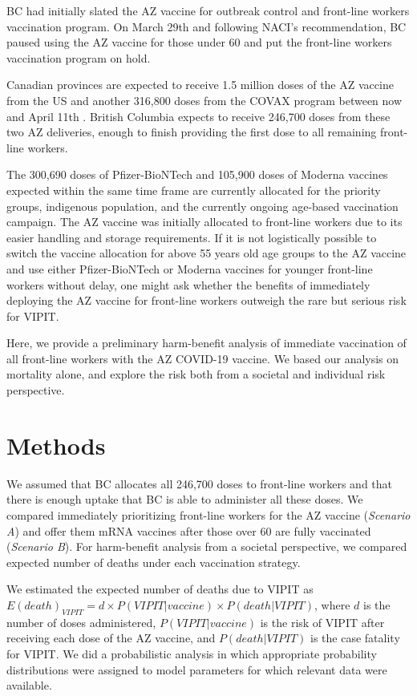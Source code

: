 \documentclass[]{interact}
\theoremstyle{plain}%
\theoremstyle{definition}
\theoremstyle{remark}
\begin{document}
BC had initially slated the AZ vaccine for outbreak control and
front-line workers vaccination program. On March 29th and following
NACI's recommendation, BC paused using the AZ vaccine for those under 60
and put the front-line workers vaccination program on hold.

Canadian provinces are expected to receive 1.5 million doses of the AZ
vaccine from the US and another 316,800 doses from the COVAX program
between now and April 11th \citep{government_of_canada_vaccines_2021}.
British Columbia expects to receive 246,700 doses from these two AZ
deliveries, enough to finish providing the first dose to all remaining
front-line workers.

The 300,690 doses of Pfizer-BioNTech and 105,900 doses of Moderna
vaccines expected within the same time frame are currently allocated for
the priority groups, indigenous population, and the currently ongoing
age-based vaccination campaign. The AZ vaccine was initially allocated
to front-line workers due to its easier handling and storage
requirements. If it is not logistically possible to switch the vaccine
allocation for above 55 years old age groups to the AZ vaccine and use
either Pfizer-BioNTech or Moderna vaccines for younger front-line
workers without delay, one might ask whether the benefits of immediately
deploying the AZ vaccine for front-line workers outweigh the rare but
serious risk for VIPIT.

Here, we provide a preliminary harm-benefit analysis of immediate
vaccination of all front-line workers with the AZ COVID-19 vaccine. We
based our analysis on mortality alone, and explore the risk both from a
societal and individual risk perspective.

\hypertarget{methods}{%
\section{Methods}\label{methods}}

We assumed that BC allocates all 246,700 doses to front-line workers and
that there is enough uptake that BC is able to administer all these
doses. We compared immediately prioritizing front-line workers for the
AZ vaccine (\emph{Scenario A}) and offer them mRNA vaccines after those
over 60 are fully vaccinated (\emph{Scenario B}). For harm-benefit
analysis from a societal perspective, we compared expected number of
deaths under each vaccination strategy.

We estimated the expected number of deaths due to VIPIT as
\(E(death)_{VIPIT} = d \times P(VIPIT|vaccine) \times P(death|VIPIT)\),
where \(d\) is the number of doses administered, \(P(VIPIT|vaccine)\) is
the risk of VIPIT after receiving each dose of the AZ vaccine, and
\(P(death|VIPIT)\) is the case fatality for VIPIT. We did a
probabilistic analysis in which appropriate probability distributions
were assigned to model parameters for which relevant data were
available.
\end{document}
